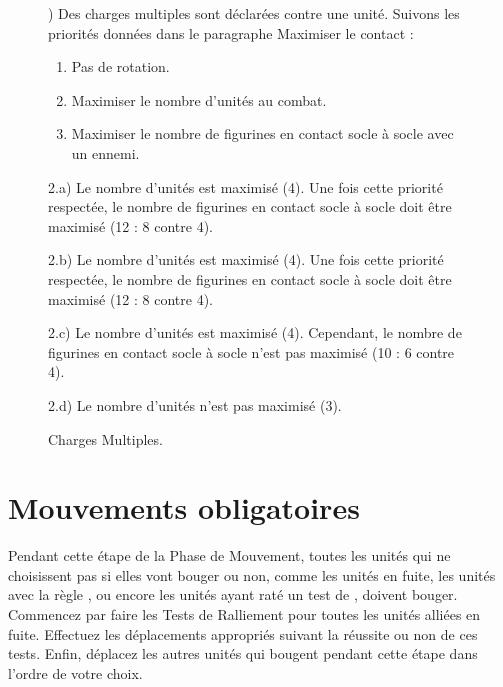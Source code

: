 \begin{figure}[!htbp]
\begin{minipage}{0.5\textwidth}
\def\svgwidth{\textwidth}

\end{minipage}\hfill\begin{minipage}{0.47\textwidth}
\caption{Charges Multiples.}
\label{figure/multiplecharges}

\vspace*{10pt}
) Des charges multiples sont déclarées contre une unité. Suivons les priorités données dans le paragraphe Maximiser le contact :
\begin{enumerate}
\item Pas de rotation.
\item Maximiser le nombre d'unités au combat.
\item Maximiser le nombre de figurines en contact socle à socle avec un ennemi.
\end{enumerate}

\vspace*{10pt}
\noindent 2.a) Le nombre d'unités est maximisé (4). Une fois cette priorité respectée, le nombre de figurines en contact socle à socle doit être maximisé (12 : 8 contre 4).

\vspace*{10pt}
\noindent 2.b) Le nombre d'unités est maximisé (4). Une fois cette priorité respectée, le nombre de figurines en contact socle à socle doit être maximisé (12 : 8 contre 4).

\vspace*{10pt}
\noindent 2.c) Le nombre d'unités est maximisé (4). Cependant, le nombre de figurines en contact socle à socle n'est pas maximisé (10 : 6 contre 4).

\vspace*{10pt}
\noindent 2.d) Le nombre d'unités n'est pas maximisé (3).
\end{minipage}
\end{figure}

\newpage
\section{Mouvements obligatoires}

Pendant cette étape de la Phase de Mouvement, toutes les unités qui ne choisissent pas si elles vont bouger ou non, comme les unités en fuite, les unités avec la règle \randommovement{}, ou encore les unités ayant raté un test de \stupidity{}, doivent bouger. Commencez par faire les Tests de Ralliement pour toutes les unités alliées en fuite. Effectuez les déplacements appropriés suivant la réussite ou non de ces tests. Enfin, déplacez les autres unités qui bougent pendant cette étape dans l'ordre de votre choix.


